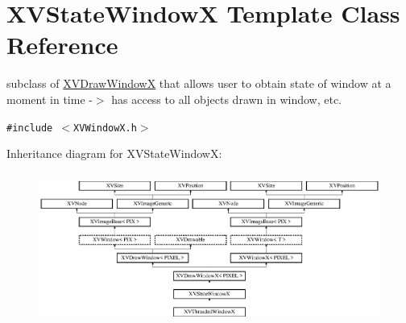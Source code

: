 \hypertarget{class_XVStateWindowX}{
\section{XVState\-Window\-X  Template Class Reference}
\label{XVStateWindowX}
}
subclass of \hyperlink{class_XVDrawWindowX}{XVDraw\-Window\-X} that allows user to obtain state of window at a moment in time -$>$ has access to all objects drawn in window, etc. 


{\tt \#include $<$XVWindow\-X.h$>$}

Inheritance diagram for XVState\-Window\-X:\begin{figure}[H]
\begin{center}
\leavevmode
\includegraphics[height=4.97778cm]{class_XVStateWindowX}
\end{center}
\end{figure}
